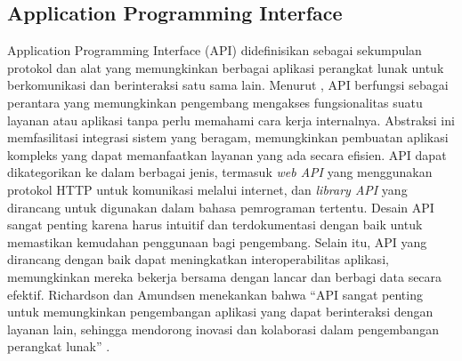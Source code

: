 \subsection{Application Programming Interface}

Application Programming Interface (API) didefinisikan sebagai sekumpulan protokol dan alat yang memungkinkan berbagai aplikasi perangkat lunak untuk berkomunikasi dan berinteraksi satu sama lain. Menurut \citet{richardson2013restful}, API berfungsi sebagai perantara yang memungkinkan pengembang mengakses fungsionalitas suatu layanan atau aplikasi tanpa perlu memahami cara kerja internalnya. Abstraksi ini memfasilitasi integrasi sistem yang beragam, memungkinkan pembuatan aplikasi kompleks yang dapat memanfaatkan layanan yang ada secara efisien.
\singlespacing{}
API dapat dikategorikan ke dalam berbagai jenis, termasuk \textit{web API} yang menggunakan protokol HTTP untuk komunikasi melalui internet, dan \textit{library API} yang dirancang untuk digunakan dalam bahasa pemrograman tertentu. Desain API sangat penting karena harus intuitif dan terdokumentasi dengan baik untuk memastikan kemudahan penggunaan bagi pengembang. Selain itu, API yang dirancang dengan baik dapat meningkatkan interoperabilitas aplikasi, memungkinkan mereka bekerja bersama dengan lancar dan berbagi data secara efektif.
\singlespacing{}
Richardson dan Amundsen menekankan bahwa ``API sangat penting untuk memungkinkan pengembangan aplikasi yang dapat berinteraksi dengan layanan lain, sehingga mendorong inovasi dan kolaborasi dalam pengembangan perangkat lunak'' \citep{richardson2013restful}.